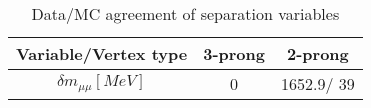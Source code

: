 \documentclass{article}
\begin{document}
\begin{table}[htbp]
\caption{\label{tab:sepVars}Data/MC agreement of separation variables}
\begin{center}
\begin{tabular}{c|c|c}
Variable/Vertex type & 3-prong & 2-prong\\
\hline
$\delta m_{\mu\mu} [MeV]$ & 0 & 1652.9/ 39\\
\hline
\end{tabular}
\end{center}
\end{table}
\end{document}
